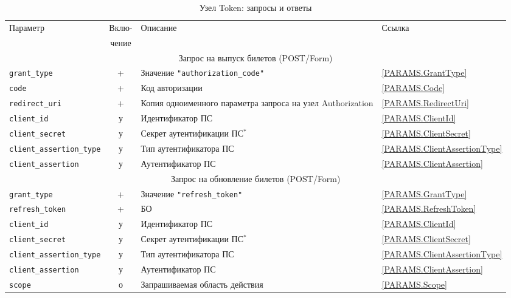\begin{table}[H]
\caption{Узел Token: запросы и ответы}\label{Table.OIDC.Token}  
\begin{tabular}{|l|c|p{8.1cm}|l|}
\hline
\multirow{2}{*}{Параметр} & Вклю- & \multirow{2}{*}{Описание} & \multirow{2}{*}{Ссылка}\\
                          & чение &&\\
\hline
\hline
\multicolumn{4}{|c|}{Запрос на выпуск билетов (POST/Form)}\\
\hline
\hline
%
\lstinline!grant_type! & + & 
Значение \lstinline!"authorization_code"! & 
\ref{PARAMS.GrantType}\\
\hline
%
\lstinline!code! & + & 
Код авторизации & 
\ref{PARAMS.Code}\\
\hline
%
\lstinline!redirect_uri! & + & 
Копия одноименного параметра запроса на узел Authorization & 
\ref{PARAMS.RedirectUri}\\
\hline
%	
\lstinline!client_id! & у & 
Идентификатор ПС & 
\ref{PARAMS.ClientId}\\
\hline
%	
\lstinline!client_secret! & у & 
Секрет аутентификации ПС$\mbox{}^*$ & 
\ref{PARAMS.ClientSecret}\\
\hline
%
\lstinline!client_assertion_type! & у &
Тип аутентификатора ПС & 
\ref{PARAMS.ClientAssertionType}\\
\hline
%	
\lstinline!client_assertion! & у & 
Аутентификатор ПС & 
\ref{PARAMS.ClientAssertion}\\
\hline
%
\hline
\multicolumn{4}{|c|}{Запрос на обновление билетов (POST/Form)}\\
\hline
\hline
%
\lstinline!grant_type! & + & 
Значение \lstinline!"refresh_token"! & 
\ref{PARAMS.GrantType}\\
\hline
%
\lstinline!refresh_token! & + &
БО & 
\ref{PARAMS.RefreshToken}\\
\hline
%	
\lstinline!client_id! & у & 
Идентификатор ПС & 
\ref{PARAMS.ClientId}\\
\hline
%	
\lstinline!client_secret! & у & 
Секрет аутентификации ПС$\mbox{}^*$ & 
\ref{PARAMS.ClientSecret}\\
\hline
%
\lstinline!client_assertion_type! & у &
Тип аутентификатора ПС & 
\ref{PARAMS.ClientAssertionType}\\
\hline
%	
\lstinline!client_assertion! & у & 
Аутентификатор ПС & 
\ref{PARAMS.ClientAssertion}\\
\hline
%	
\lstinline!scope! & о & 
Запрашиваемая область действия & 
\ref{PARAMS.Scope}\\

\end{tabular}
\end{table}
